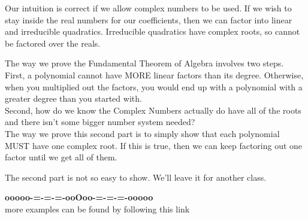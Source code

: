 \documentclass{ximera}
\begin{document}
Our intuition is correct if we allow complex numbers to be used.  If we wish to stay inside the real numbers for our coefficients, then we can factor into linear and irreducible quadratics.  Irreducible quadratics have complex roots, so cannot be factored over the reals.



\begin{idea}


The way we prove the Fundamental Theorem of Algebra involves two steps. \\


First, a polynomial cannot have MORE linear factors than its degree. Otherwise, when you multiplied out the factors, you would end up with a polynomial with a greater degree than you started with.\\


Second, how do we know the Complex Numbers actually do have all of the roots and there isn't some bigger number system needed? \\

The way we prove this second part is to simply show that each polynomial MUST have one complex root. If this is true, then we can keep factoring out one factor until we get all of them.

The second part is not so easy to show.  We'll leave it for another class.


\end{idea}




















\begin{center}
\textbf{\textcolor{green!50!black}{ooooo-=-=-=-ooOoo-=-=-=-ooooo}} \\

more examples can be found by following this link\\ 

\end{center}
\end{document}
